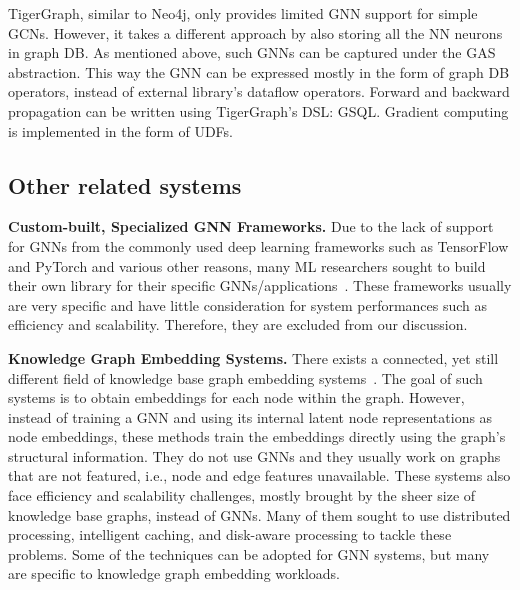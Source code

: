 TigerGraph, similar to Neo4j, only provides limited GNN support for simple GCNs. However, it takes a different approach by also storing all the NN neurons in graph DB. As mentioned above, such GNNs can be captured under the GAS abstraction. This way the GNN can be expressed mostly in the form of graph DB operators, instead of external library's dataflow operators. Forward and backward propagation can be written using TigerGraph's DSL: GSQL. Gradient computing is implemented in the form of UDFs.


\subsection{Other related systems}

\vspace{2mm}
\noindent \textbf{Custom-built, Specialized GNN Frameworks.} Due to the lack of support for GNNs from the commonly used deep learning frameworks such as TensorFlow and PyTorch and various other reasons, many ML researchers sought to build their own library for their specific GNNs/applications~\cite{agl, graphsage}. These frameworks usually are very specific and have little consideration for system performances such as efficiency and scalability. Therefore, they are excluded from our discussion.


\vspace{2mm}
\noindent \textbf{Knowledge Graph Embedding Systems.} There exists a connected, yet still different field of knowledge base graph embedding systems~\cite{marius, dgl-ke, pbg, lightne}. The goal of such systems is to obtain embeddings for each node within the graph. However, instead of training a GNN and using its internal latent node representations as node embeddings, these methods train the embeddings directly using the graph's structural information. They do not use GNNs and they usually work on graphs that are not featured, i.e., node and edge features unavailable. These systems also face efficiency and scalability challenges, mostly brought by the sheer size of knowledge base graphs, instead of GNNs. Many of them sought to use distributed processing, intelligent caching, and disk-aware processing to tackle these problems. Some of the techniques can be adopted for GNN systems, but many are specific to knowledge graph embedding workloads.

